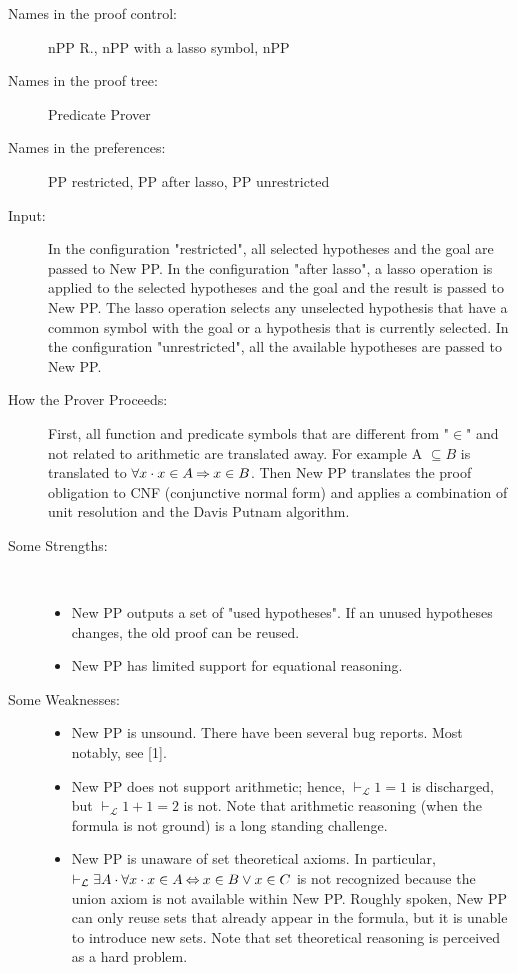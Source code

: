 \begin{description}
	\item[Names in the proof control:] nPP R., nPP with a lasso symbol, nPP
	\item[Names in the proof tree:] Predicate Prover
	\item[Names in the preferences:] PP restricted, PP after lasso, PP unrestricted
	\item[Input:] In the configuration "restricted", all selected hypotheses and the goal are passed to New PP. In the configuration "after lasso", a lasso operation is applied to the selected hypotheses and the goal and the result is passed to New PP. The lasso operation selects any unselected hypothesis that have a common symbol with the goal or a hypothesis that is currently selected. In the configuration "unrestricted", all the available hypotheses are passed to New PP.
	\item[How the Prover Proceeds:] First, all function and predicate symbols that are different from "$\in$" and not related to arithmetic are translated away. For example A $\subseteq B$ is translated to $\forall x\cdot x \in A \mathbin\Rightarrow x \in B$. Then New PP translates the proof obligation to CNF (conjunctive normal form) and applies a combination of unit resolution and the Davis Putnam algorithm.
	\item[Some Strengths:] ~
	\begin{itemize}
		\item New PP outputs a set of "used hypotheses". If an unused hypotheses changes, the old proof can be reused.
		\item New PP has limited support for equational reasoning. 
	\end{itemize}
	\item[Some Weaknesses:]
	\begin{itemize} ~
		\item New PP is unsound. There have been several bug reports. Most notably, see [1].
		\item New PP does not support arithmetic; hence, $\vdash_{\mathcal L} 1=1$ is discharged, but $\vdash_{\mathcal L} 1+1=2$ is not. Note that arithmetic 	reasoning (when the formula is not ground) is a long standing challenge.
		\item New PP is unaware of set theoretical axioms. In particular, $\vdash_{\mathcal L} \exists A\cdot \forall x\cdot x \in A \mathbin\Leftrightarrow x \in B \lor x \in C$ is not recognized because the union axiom is not available within New PP. Roughly spoken, New PP can only reuse sets that already appear in the formula, but it is unable to introduce new sets. Note that set theoretical reasoning is perceived as a hard problem.

\end{itemize}
\end{description}
